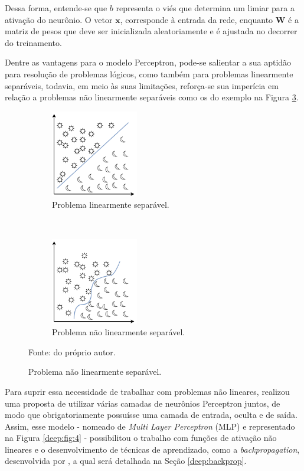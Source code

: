 Dessa forma, entende-se que $b$ representa o viés que determina um limiar para a ativação do neurônio. O vetor $\textbf{x}$, corresponde à entrada da rede, enquanto $\textbf{W}$ é a matriz de pesos que deve ser inicializada aleatoriamente e é ajustada no decorrer do treinamento.

Dentre as vantagens para o modelo Perceptron, pode-se salientar a sua aptidão para resolução de problemas lógicos, como também para problemas linearmente separáveis, todavia, em meio às suas limitações, reforça-se sua imperícia em relação a problemas não linearmente separáveis como os do exemplo na Figura \ref{deep:fig:3.2}.

\begin{figure}[H]
   \caption{Representação de problemas linearmente e não linearmente separáveis.}
   \centering
   \label{deep:fig:3}
    \begin{subfigure}[t]{0.45\textwidth}
        \centering
        \includegraphics[height=1.5in]{recursos/imagens/deep/l_separavel.png}
        \caption{Problema linearmente separável.}
        \label{deep:fig:3.1}
    \end{subfigure}%
    ~ 
    \begin{subfigure}[t]{0.45\textwidth}
        \centering
        \includegraphics[height=1.5in]{recursos/imagens/deep/nl_separavel.png}
        \caption{Problema não linearmente separável.}
        \label{deep:fig:3.2}
    \end{subfigure}%

    Fonte: do próprio autor.
\end{figure}

Para suprir essa necessidade de trabalhar com problemas não lineares, \cite{Werbos:74} realizou uma proposta de utilizar várias camadas de neurônios Perceptron juntos, de modo que obrigatoriamente possuísse uma camada de entrada, oculta e de saída. Assim, esse modelo - nomeado de \textit{Multi Layer Perceptron} (MLP) \citep{Werbos:74} e representado na Figura \ref{deep:fig:4} - possibilitou o trabalho com funções de ativação não lineares e o desenvolvimento de técnicas de aprendizado, como a \textit{backpropagation}, desenvolvida por \cite{rumelhart1986learning}, a qual será detalhada na Seção \ref{deep:backprop}.

